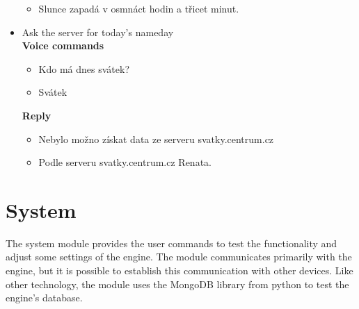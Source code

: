 \begin{itemize}
\begin{itemize}
        \item Slunce zapadá v osmnáct hodin a třicet minut.
    \end{itemize}
    \item Ask the server for today's nameday\\
    \textbf{Voice commands}
    \begin{itemize}
        \item Kdo má dnes svátek?
        \item Svátek
    \end{itemize}
    \textbf{Reply}
    \begin{itemize}
        \item Nebylo možno získat data ze serveru svatky.centrum.cz
        \item Podle serveru svatky.centrum.cz Renata.
    \end{itemize}
\end{itemize}

\section{System}

The system module provides the user commands to test the functionality and adjust some settings of the engine. The module communicates primarily with the engine, but it is possible to establish this communication with other devices. Like other technology, the module uses the MongoDB library from python to test the engine's database.

